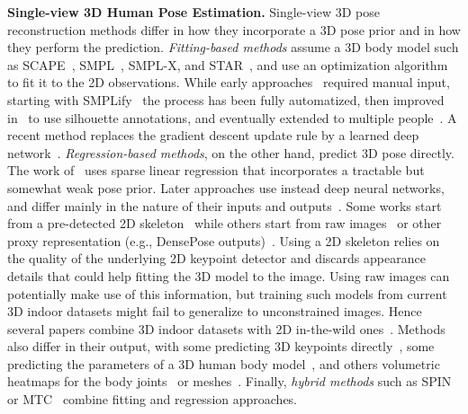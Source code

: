 \documentclass[10pt,twocolumn,letterpaper]{article}
\begin{document}
	\noindent \textbf{Single-view 3D Human Pose Estimation.}
Single-view 3D pose reconstruction methods differ in how they incorporate a 3D pose prior and in how they perform the prediction.
\emph{Fitting-based methods} assume a 3D body model such as SCAPE~\cite{anguelov2005scape}, SMPL~\cite{Loper2015}, SMPL-X\cite{pavlakos19expressive}, and STAR~\cite{STAR:2020}, and use an optimization algorithm to fit it to the 2D observations.
	While early approaches~\cite{guan09estimating,sigal08combined} required manual input, starting with SMPLify~\cite{Bogo2016} the process has been fully automatized, then improved in~\cite{Lassner:UP:2017} to use silhouette annotations, and eventually extended to multiple people~\cite{zanfir18monocular}. A recent method replaces the gradient descent update rule by a learned deep network~\cite{song2020human}.
\emph{Regression-based methods}, on the other hand, predict 3D pose directly.
	The work of~\cite{Ramakrishna2012} uses sparse linear regression that incorporates a tractable but somewhat weak pose prior.
	Later approaches use instead deep neural networks, and differ mainly in the nature of their inputs and outputs~\cite{tan17indirect,Tung2017,martinez2017simple,pavlakos2017coarse,pavlakos2018ordinal,omran18neural,pavlakos18learning,kanazawa2018end,kolotouros19convolutional,xiang2019monocular,Cheng_2019_ICCV,xu2019denserac,kocabas2019vibe, moon2020i2l}.
	Some works start from a pre-detected 2D skeleton~\cite{martinez2017simple, choi2020pose2mesh} while others start from raw images~\cite{omran18neural, kanazawa2018end, kolotouros19convolutional, rong2019delving} or other proxy representation (e.g., DensePose outputs)~\cite{xu2019denserac}.
	Using a 2D skeleton relies on the quality of the underlying 2D keypoint detector and discards appearance details that could help fitting the 3D model to the image.
	Using raw images can potentially make use of this information, but training such models from current 3D indoor datasets might fail to generalize to unconstrained images.
	Hence several papers combine 3D indoor datasets with 2D in-the-wild ones~\cite{xiang2019monocular,kolotouros19convolutional,Tung2017,pavlakos18learning,omran18neural,kanazawa2018end,kocabas2019vibe,sun2019human,song2020human}.
	Methods also differ in their output, with some predicting 3D keypoints directly~\cite{martinez2017simple}, some predicting the parameters of a 3D human body model~\cite{kanazawa2018end,xiang2019monocular}, and others volumetric heatmaps for the body joints~\cite{pavlakos2017coarse} or meshes~\cite{kolotouros19convolutional, choi2020pose2mesh}.
Finally, \emph{hybrid methods} such as SPIN~\cite{pavlakos19expressive} or MTC~\cite{xiang2019monocular} combine fitting and regression approaches.
\end{document}
